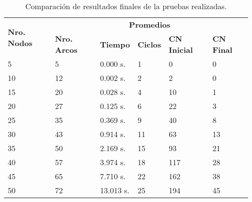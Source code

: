 	\begin{table}[H]
		\caption{Comparación de resultados finales de la pruebas realizadas.}
		\label{tab:resultados_comparacion}
		\begin{tabularx}{\linewidth}{|X|X|p{1.5cm}|X|X|X|}
			\hline
			\multirow{2}{2cm}{\textbf{Nro. Nodos}} & \multicolumn{5}{c|}{\textbf{Promedios}} \\
			\cline{2-6}
			& \textbf{Nro. Arcos} & \textbf{Tiempo} & \textbf{Ciclos} & \textbf{CN Inicial} & \textbf{CN Final} \\
			\hline
			5 & 5 & 0.000 s. & 1 & 0 & 0 \\
			\hline
			10 & 12 & 0.002 s. & 2 & 2 & 0 \\
			\hline
			15 & 20 & 0.028 s. & 4 & 10 & 1 \\
			\hline
			20 & 27 & 0.125 s. & 6 & 22 & 3 \\
			\hline
			25 & 35 & 0.369 s. & 9 & 40 & 8 \\
			\hline
			30 & 43 & 0.914 s. & 11 & 63 & 13 \\
			\hline
			35 & 50 & 2.169 s. & 15 & 93 & 21 \\
			\hline
			40 & 57 & 3.974 s. & 18 & 117 & 28 \\
			\hline
			45 & 65 & 7.710 s. & 22 & 162 & 38 \\
			\hline
			50 & 72 & 13.013 s. & 25 & 194 & 45 \\
			\hline
		\end{tabularx}
	\end{table}
	
	
	
